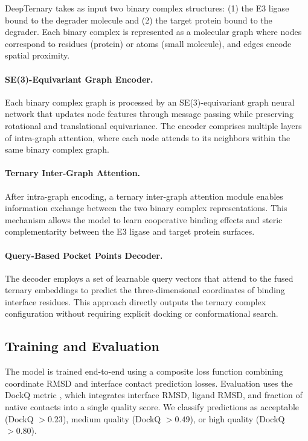 \documentclass[11pt]{article}
\begin{document}
DeepTernary takes as input two binary complex structures: (1) the E3 ligase bound to the degrader molecule and (2) the target protein bound to the degrader. Each binary complex is represented as a molecular graph where nodes correspond to residues (protein) or atoms (small molecule), and edges encode spatial proximity.

\paragraph{SE(3)-Equivariant Graph Encoder.}
Each binary complex graph is processed by an SE(3)-equivariant graph neural network that updates node features through message passing while preserving rotational and translational equivariance. The encoder comprises multiple layers of intra-graph attention, where each node attends to its neighbors within the same binary complex graph.

\paragraph{Ternary Inter-Graph Attention.}
After intra-graph encoding, a ternary inter-graph attention module enables information exchange between the two binary complex representations. This mechanism allows the model to learn cooperative binding effects and steric complementarity between the E3 ligase and target protein surfaces.

\paragraph{Query-Based Pocket Points Decoder.}
The decoder employs a set of learnable query vectors that attend to the fused ternary embeddings to predict the three-dimensional coordinates of binding interface residues. This approach directly outputs the ternary complex configuration without requiring explicit docking or conformational search.

\subsection{Training and Evaluation}

The model is trained end-to-end using a composite loss function combining coordinate RMSD and interface contact prediction losses. Evaluation uses the DockQ metric \citep{basu2016}, which integrates interface RMSD, ligand RMSD, and fraction of native contacts into a single quality score. We classify predictions as acceptable (DockQ $> 0.23$), medium quality (DockQ $> 0.49$), or high quality (DockQ $> 0.80$).
\end{document}
